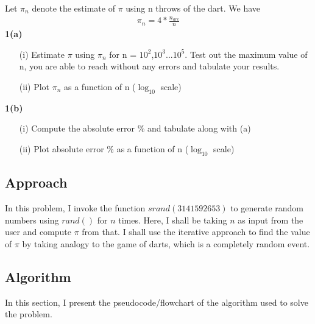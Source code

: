\documentclass[titlepage, 11pt]{article}
\begin{document}
Let ${{\pi}_{n}}$ denote the estimate of $\pi$ using n throws of the dart. We have
\begin{align}
    {{\pi}_{n}} = 4 * \frac{n_{arc}}{n}
\end{align}
\textbf{1(a)} \\
\begin{itemize}
    \item [(i)]Estimate $\pi$ using ${{\pi}_{n}}$ for n = $10^2$,$10^3$...$10^5$. Test out the maximum value of n, you are able to reach without any errors and tabulate your results.
    \item [(ii)]Plot ${{\pi}_{n}}$ as a function of n ($\log_{10}$ scale) \\
\end{itemize}
\textbf{1(b)} \\
\begin{itemize}
    \item [(i)] Compute the absolute error \% and tabulate along with (a)
    \item [(ii)]Plot absolute error \%  as a function of n ($\log_{10}$ scale) \\
\end{itemize}

\subsection{Approach}

In this problem, I invoke the function $srand(3141592653)$ to generate random numbers using $rand()$ for $n$ times. 
Here, I shall be taking $n$ as input from the user and compute $\pi$ from that.  
I shall use the iterative approach to find the value of $\pi$ by taking analogy to the game of darts, which is a completely random event. 


\subsection{Algorithm}
In this section, I present the pseudocode/flowchart of the algorithm used to solve the problem.
\end{document}
